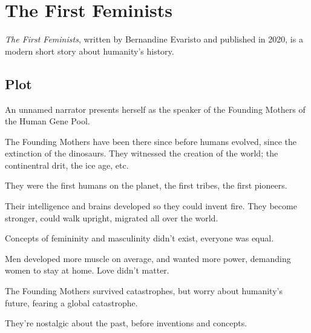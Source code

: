\documentclass{article}
\begin{document}
\section{The First Feminists}
\emph{The First Feminists}, written by Bernandine Evaristo and published in 2020, is a modern short story about humanity's history.
 
\subsection{Plot}
An unnamed narrator presents herself as the speaker of the Founding Mothers of the Human Gene Pool.
 
The Founding Mothers have been there since before humans evolved, since the extinction of the dinosaurs. They witnessed the creation of the world; the continentral drit, the ice age, etc.
 
They were the first humans on the planet, the first tribes, the first pioneers.
 
Their intelligence and brains developed so they could invent fire. They become stronger, could walk upright, migrated all over the world.
 
Concepts of femininity and masculinity didn't exist, everyone was equal.
 
Men developed more muscle on average, and wanted more power, demanding women to stay at home. Love didn't matter.
 
The Founding Mothers survived catastrophes, but worry about humanity's future, fearing a global catastrophe.
 
They're nostalgic about the past, before inventions and concepts.  
\end{document}
